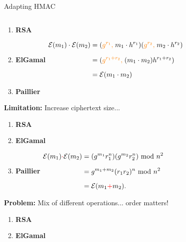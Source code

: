 \begin{frame}{Adapting HMAC}
\begin{columns}
\begin{column}{0.5\textwidth}
\begin{itemize}
{\begin{enumerate}
                \setlength\itemsep{3mm}
                \item \textbf{RSA}
                \item \textbf{ElGamal}\vspace{2mm}\newline
                $\begin{aligned}
                    {\mathcal {E}}(m_{1}) \cdot {\mathcal {E}}(m_{2}) 
                    &=({\color{orange}g^{r_{1}},}\; m_{1}\cdot h^{r_{1}})({\color{orange}g^{r_{2}},}\; m_{2}\cdot h^{r_{2}})\\[6pt]
                    &=({\color{orange}g^{r_{1}+r_{2}},}\; (m_{1}\cdot m_{2})h^{r_{1}+r_{2}})\\[6pt]
                    &={\mathcal {E}}(m_{1}\cdot m_{2})
                \end{aligned}$
                \item \textbf{Paillier}
            \end{enumerate}\vspace{4mm}
            \textbf{\color{orange}Limitation:} Increase ciphertext size...
        }  {
            \begin{enumerate}\scriptsize
                \setlength\itemsep{3mm}
                \item \textbf{RSA}
                \item \textbf{ElGamal}
                \item \textbf{Paillier}\vspace{2mm}\newline
                $\begin{aligned}
                    {\mathcal {E}}(m_{1}) {\color{red}\cdot} {\mathcal {E}}(m_{2})
                    &=(g^{m_{1}}r_{1}^{n})(g^{m_{2}}r_{2}^{n})\;{\bmod {\;}}n^{2}\\[6pt]
                    &=g^{m_{1}+m_{2}}(r_{1}r_{2})^{n}\;{\bmod {\;}}n^{2}\\[6pt]
                    &={\mathcal {E}}(m_{1} {\color{red}+} m_{2}).
                \end{aligned}$
            \end{enumerate}\vspace{4mm}
            \textbf{\color{red}Problem:} Mix of different operations... order matters!
        }  {
            \begin{enumerate}\scriptsize
                \setlength\itemsep{3mm}
                \item \textbf{RSA}
                \item \textbf{ElGamal}

\end{enumerate}}
\end{itemize}
\end{column}
\end{columns}
\end{frame}
